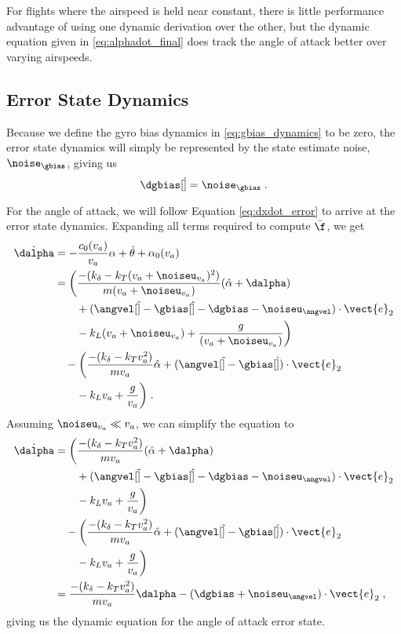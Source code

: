 For flights where the airspeed is held near constant, there is little performance advantage of using one dynamic derivation over the other, but the dynamic equation given in \eqref{eq:alphadot_final} does track the angle of attack better over varying airspeeds.

\subsection{Error State Dynamics}
\label{append:error_dyn_derivation}
Because we define the gyro bias dynamics in \eqref{eq:gbias_dynamics} to be zero, the error state dynamics will simply be represented by the state estimate noise, $\noise_{\gbias}$, giving us
\begin{equation*}
  \dgbias[\dot] = \noise_{\gbias} \;.
\end{equation*}

For the angle of attack, we will follow Equation \eqref{eq:dxdot_error} to arrive at the error state dynamics. Expanding all terms required to compute $\bar{\f}$, we get
\begin{align}
  \dot{\dalpha} &= -\frac{c_0(v_a)}{v_a}\alpha + \dot{\theta} + \alpha_0(v_a) \\
    &= \bigg(\frac{-(k_\delta - k_T (v_a + \noiseu_{v_a})^2)}{m(v_a + \noiseu_{v_a})}(\hat{\alpha} + \dalpha) \nonumber \\
    &\hspace{2em}+ (\angvel[\tilde] - \gbias[\hat] - \dgbias - \noiseu_{\angvel})\cdot\vect{e}_2 \nonumber \\
    &\hspace{2em}- k_L (v_a + \noiseu_{v_a}) + \frac{g}{(v_a + \noiseu_{v_a})}\bigg) \\
    &\hspace{1em}- \bigg(\frac{-(k_\delta - k_T v_a^2)}{mv_a}\hat{\alpha} + (\angvel[\tilde] - \gbias[\hat])\cdot\vect{e}_2 \nonumber \\
    &\hspace{2em}- k_L v_a + \frac{g}{v_a }\bigg) \nonumber \;.
\end{align}
Assuming $\noiseu_{v_a} \ll v_a$, we can simplify the equation to
\begin{align}
  \dot{\dalpha} &= \bigg(\frac{-(k_\delta - k_T v_a^2)}{mv_a}(\hat{\alpha} + \dalpha) \\
    &\hspace{2em}+ (\angvel[\tilde] - \gbias[\hat] - \dgbias - \noiseu_{\angvel})\cdot\vect{e}_2 \\
    &\hspace{2em}- k_L v_a + \frac{g}{v_a}\bigg) \\
    &\hspace{1em}- \bigg(\frac{-(k_\delta - k_T v_a^2)}{mv_a}\hat{\alpha} + (\angvel[\tilde] - \gbias[\hat])\cdot\vect{e}_2 \\
    &\hspace{2em}- k_L v_a + \frac{g}{v_a }\bigg) \\
    &= \frac{-(k_\delta - k_T v_a^2)}{mv_a}\dalpha - (\dgbias + \noiseu_{\angvel})\cdot\vect{e}_2 \;,
\end{align}
giving us the dynamic equation for the angle of attack error state.
